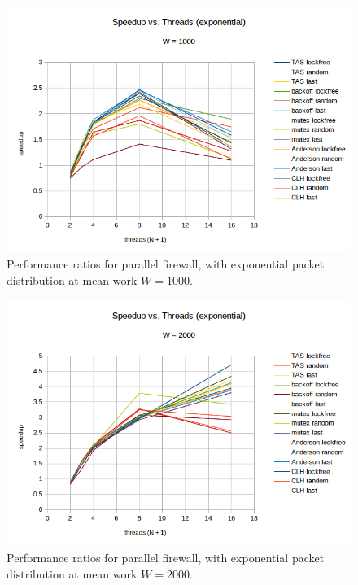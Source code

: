 \documentclass{article}
\begin{document}

\begin{figure}
\begin{center}
	\includegraphics[scale=.8]{packet_3_1000.png}
	\caption{Performance ratios for parallel firewall, with exponential packet distribution at mean work $W = 1000$.}
	\label{packet_3_1000}
\end{center}
\end{figure}

\begin{figure}
\begin{center}
	\includegraphics[scale=.8]{packet_3_2000.png}
	\caption{Performance ratios for parallel firewall, with exponential packet distribution at mean work $W = 2000$.}
	\label{packet_3_2000}
\end{center}
\end{figure}
\end{document}
